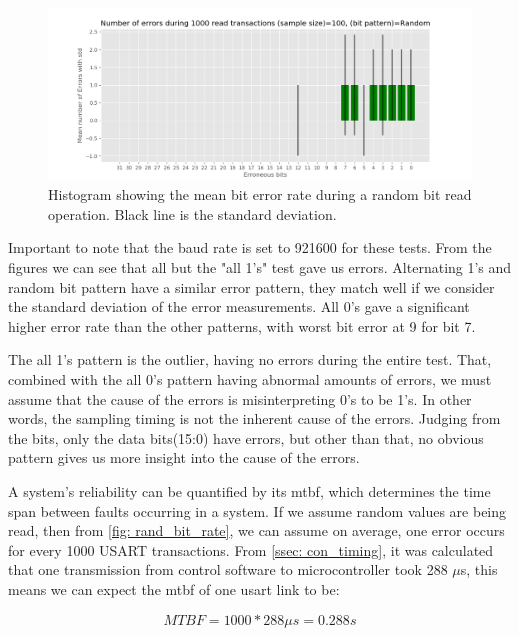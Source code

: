 \documentclass[main.tex]{subfiles}
\begin{document}
\begin{figure}[!ht]
    \centering
    \includegraphics[width=18cm]{images/error_rate_random.png}
    \caption{Histogram showing the mean bit error rate during a random bit read operation. Black line is the standard deviation.}
    \label{fig: rand_bit_rate}
\end{figure}
\FloatBarrier

Important to note that the baud rate is set to 921600 for these tests. From the figures we can see that all but the "all 1's" test gave us errors. Alternating 1's and random bit pattern have a similar error pattern, they match well if we consider the standard deviation of the error measurements. All 0's gave a significant higher error rate than the other patterns, with worst bit error at 9 for bit 7.


The all 1's pattern is the outlier, having no errors during the entire test. That, combined with the all 0's pattern having abnormal amounts of errors, we must assume that the cause of the errors is misinterpreting 0's to be 1's. In other words, the sampling timing is not the inherent cause of the errors. Judging from the bits, only the data bits(15:0) have errors, but other than that, no obvious pattern gives us more insight into the cause of the errors.

A system's reliability can be quantified by its \gls{mtbf}, which determines the time span between faults occurring in a system\cite{mtbf_intro}. If we assume random values are being read, then from \autoref{fig: rand_bit_rate}, we can assume on average, one error occurs for every 1000 USART transactions. From \autoref{ssec: con_timing}, it was calculated that one transmission from control software to microcontroller took 288 $\mu$s, this means we can expect the \gls{mtbf} of one \gls{usart} link to be:

\begin{equation} \label{eqn:single_mtbf}
MTBF = 1000*288\mu s = 0.288 s
\end{equation}
\end{document}
